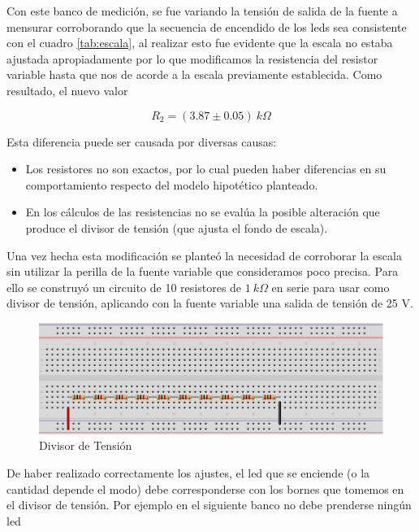 \documentclass[12pt,a4paper]{article}
\begin{document}
			Con este banco de medición, se fue variando la tensión de salida de la fuente a mensurar corroborando que la secuencia de encendido de los leds sea consistente con el cuadro \ref{tab:escala}, al realizar esto fue evidente que la escala no estaba ajustada apropiadamente por lo que modificamos la resistencia del resistor variable hasta que nos de acorde a la escala previamente establecida. Como resultado, el nuevo valor

			\begin{equation}
				R_2 = (3.87 \pm 0.05) \: k \Omega
			\end{equation}

			Esta diferencia puede ser causada por diversas causas:
			\begin{itemize}
				\item Los resistores no son exactos, por lo cual pueden haber diferencias en su comportamiento respecto del modelo hipotético planteado.

				\item En los cálculos de las resistencias no se evalúa la posible alteración que produce el divisor de tensión (que ajusta el fondo de escala).
			\end{itemize}

			Una vez hecha esta modificación se planteó la necesidad de corroborar la escala sin utilizar la perilla de la fuente variable que consideramos poco precisa. Para ello se construyó un circuito de 10 resistores de $1 \: k\Omega$ en serie para usar como divisor de tensión, aplicando con la fuente variable una salida de tensión de 25 V.

			\begin{figure}[H]
			\centering
				\includegraphics[scale=1]{images/div.pdf}\caption{Divisor de Tensión}\label{fig:divtens}
			\end{figure}

			De haber realizado correctamente los ajustes, el led que se enciende (o la cantidad depende el modo) debe corresponderse con los bornes que tomemos en el divisor de tensión. Por ejemplo en el siguiente banco no debe prenderse ningún led
			
\end{document}
